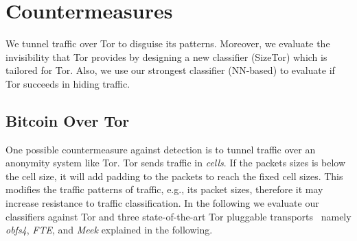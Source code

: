 \section{Countermeasures}
We tunnel \bc traffic over Tor to disguise its patterns. Moreover, we evaluate the invisibility that Tor provides by designing a new classifier (SizeTor) which is tailored for Tor. Also, we use our strongest classifier (NN-based) to evaluate if Tor succeeds in hiding \bc traffic.

\subsection{Bitcoin Over Tor}\label{sec:tor}
One possible countermeasure against \bc detection is to tunnel \bc traffic over 
an anonymity system like Tor. 
Tor sends traffic in \textit{cells}. If the packets sizes is below the cell size, it will add padding to the packets to reach the fixed cell sizes. This modifies the traffic patterns of \bc traffic, e.g., its packet sizes, therefore it may increase resistance to traffic classification. 
In the following we evaluate our classifiers against Tor and three state-of-the-art Tor 
pluggable transports~\cite{pluggable-transport} namely \textit{obfs4}, \textit{FTE}, and \textit{Meek} explained in the following. 

